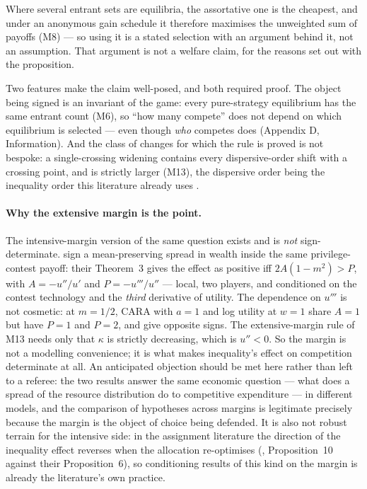 \documentclass[11pt,a4paper]{article}
\begin{document}
Where several entrant sets are equilibria, the assortative one is the
cheapest, and under an anonymous gain schedule it therefore maximises the
unweighted sum of payoffs (M8) --- so using it is
a stated selection with an argument behind it, not an assumption. That
argument is not a welfare claim, for the reasons set out with the
proposition.

Two features make the claim well-posed, and both required proof. The object
being signed is an invariant of the game: every pure-strategy equilibrium has
the same entrant count (M6), so ``how many
compete'' does not depend on which equilibrium is selected --- even though
\emph{who} competes does (Appendix D, Information). And the class
of changes for which the rule is proved is not bespoke: a single-crossing
widening contains every dispersive-order shift with a crossing point, and is
strictly larger (M13), the dispersive order being the inequality order this
literature already uses \citep{HopkinsKornienko2009,Shaked1982}.

\paragraph{Why the extensive margin is the point.} The intensive-margin
version of the same question exists and is \emph{not} sign-determinate.
\citet{SchroyenTreich2016} sign a mean-preserving spread in wealth inside the
same privilege-contest payoff: their Theorem~3 gives the effect as positive
iff $2A(1-m^2) > P$, with $A = -u''/u'$ and $P = -u'''/u''$ --- local, two
players, and conditioned on the contest technology and the \emph{third}
derivative of utility. The dependence on $u'''$ is not cosmetic: at $m=1/2$,
CARA with $a=1$ and log utility at $w=1$ share $A=1$ but have $P=1$ and
$P=2$, and give opposite signs. The extensive-margin rule of
M13 needs only that $\kappa$ is strictly decreasing,
which is $u''<0$. So the margin is not a modelling convenience; it is what
makes inequality's effect on competition determinate at all. An anticipated
objection should be met here rather than left to a referee: the two results
answer the same economic question --- what does a spread of the resource
distribution do to competitive expenditure --- in different models, and the
comparison of hypotheses across margins is legitimate precisely because the
margin is the object of choice being defended. It is also not robust
terrain for the intensive side: in the assignment literature the direction
of the inequality effect reverses when the allocation re-optimises
(\citet{CostrellLoury2004}, Proposition~10 against their Proposition~6), so
conditioning results of this kind on the margin is already the literature's
own practice.
\end{document}
